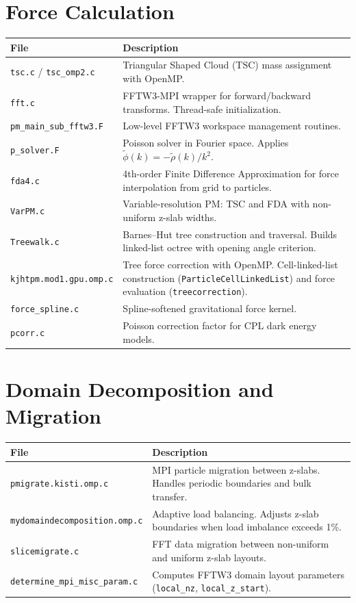 \documentclass[11pt,fleqn]{book}
\newcommand{\code}[1]{\texttt{#1}}
\newcommand{\file}[1]{\texttt{#1}}
\begin{document}
\section{Force Calculation}

\begin{longtable}{L{5.5cm} L{8cm}}
\toprule
\textbf{File} & \textbf{Description} \\
\midrule
\endhead
\file{tsc.c} / \file{tsc\_omp2.c} & Triangular Shaped Cloud (TSC) mass assignment with OpenMP. \\
\file{fft.c} & FFTW3-MPI wrapper for forward/backward transforms. Thread-safe initialization. \\
\file{pm\_main\_sub\_fftw3.F} & Low-level FFTW3 workspace management routines. \\
\file{p\_solver.F} & Poisson solver in Fourier space.  Applies $\tilde\phi(k) = -\tilde\rho(k)/k^2$. \\
\file{fda4.c} & 4th-order Finite Difference Approximation for force interpolation from grid to particles. \\
\file{VarPM.c} & Variable-resolution PM: TSC and FDA with non-uniform z-slab widths. \\
\file{Treewalk.c} & Barnes--Hut tree construction and traversal.  Builds linked-list octree with opening angle criterion. \\
\file{kjhtpm.mod1.gpu.omp.c} & Tree force correction with OpenMP.  Cell-linked-list construction (\code{ParticleCellLinkedList}) and force evaluation (\code{treecorrection}). \\
\file{force\_spline.c} & Spline-softened gravitational force kernel. \\
\file{pcorr.c} & Poisson correction factor for CPL dark energy models. \\
\bottomrule
\end{longtable}

\section{Domain Decomposition and Migration}

\begin{longtable}{L{6cm} L{7.5cm}}
\toprule
\textbf{File} & \textbf{Description} \\
\midrule
\endhead
\file{pmigrate.kisti.omp.c} & MPI particle migration between z-slabs.  Handles periodic boundaries and bulk transfer. \\
\file{mydomaindecomposition.omp.c} & Adaptive load balancing.  Adjusts z-slab boundaries when load imbalance exceeds 1\%. \\
\file{slicemigrate.c} & FFT data migration between non-uniform and uniform z-slab layouts. \\
\file{determine\_mpi\_misc\_param.c} & Computes FFTW3 domain layout parameters (\code{local\_nz}, \code{local\_z\_start}). \\
\bottomrule
\end{longtable}
\end{document}
